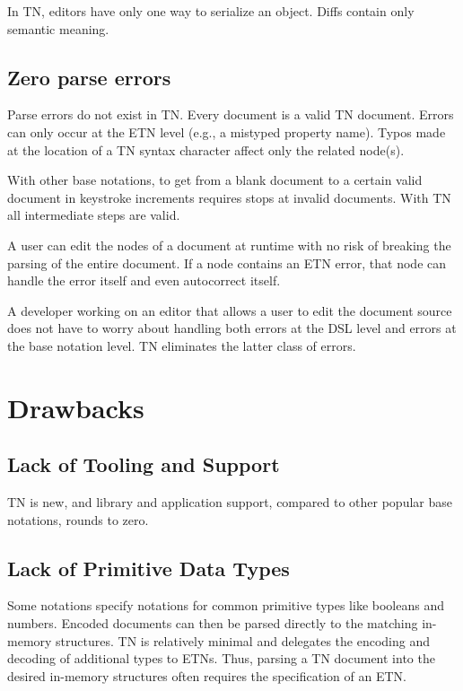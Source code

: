 \documentclass[journal]{IEEEtran}
\begin{document}
In TN, editors have only one way to serialize an object. Diffs contain only semantic meaning.

\subsection{Zero parse errors}

Parse errors do not exist in TN. Every document is a valid TN document. Errors can only occur at the ETN level (e.g., a mistyped property name). Typos made at the location of a TN syntax character affect only the related node(s).

With other base notations, to get from a blank document to a certain valid document in keystroke increments requires stops at invalid documents. With TN all intermediate steps are valid.

A user can edit the nodes of a document at runtime with no risk of breaking the parsing of the entire document. If a node contains an ETN error, that node can handle the error itself and even autocorrect itself.

A developer working on an editor that allows a user to edit the document source does not have to worry about handling both errors at the DSL level and errors at the base notation level. TN eliminates the latter class of errors.

\section{Drawbacks}

\subsection{Lack of Tooling and Support}

TN is new, and library and application support, compared to other popular base notations, rounds to zero.

\subsection{Lack of Primitive Data Types}

Some notations specify notations for common primitive types like booleans and numbers. Encoded documents can then be parsed directly to the matching in-memory structures. TN is relatively minimal and delegates the encoding and decoding of additional types to ETNs. Thus, parsing a TN document into the desired in-memory structures often requires the specification of an ETN.
\end{document}
